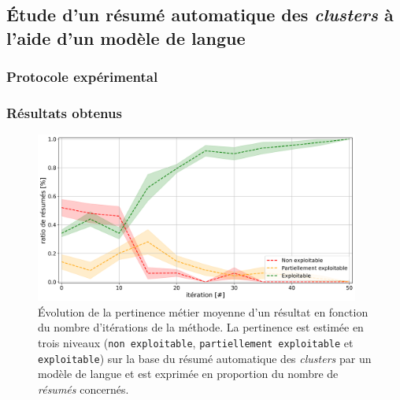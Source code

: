 	\subsection{Étude d'un résumé automatique des \textit{clusters} à l'aide d'un modèle de langue}
	\label{section:4.4.3-ETUDE-PERTINENCE-RESUME-AUTOMATIQUE}
	
		\subsubsection{Protocole expérimental}
		

		\subsubsection{Résultats obtenus}
		
			
			
			\begin{figure}[!htb]
				\centering
				\includegraphics[width=0.95\textwidth]{figures/etude-pertinence-llm-check-resume-annotation-favori}
				\caption{Évolution de la pertinence métier moyenne d'un résultat en fonction du nombre d'itérations de la méthode.
				La pertinence est estimée en trois niveaux (\texttt{non exploitable}, \texttt{partiellement exploitable} et \texttt{exploitable}) sur la base du résumé automatique des \textit{clusters} par un modèle de langue et est exprimée en proportion du nombre de \textit{résumés} concernés.}
				\label{figure:4.4.1-ETUDE-PERTINENCE-VERIFICATION-MANUELLE}
			\end{figure}

